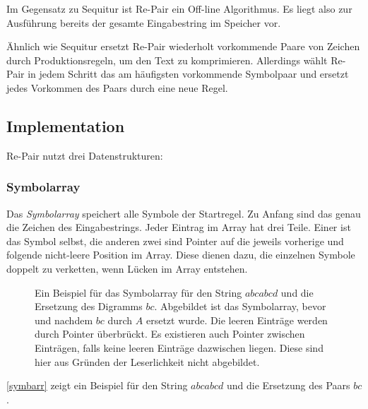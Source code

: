 Im Gegensatz zu Sequitur ist Re-Pair \cite{larsson_off-line_2000} ein Off-line Algorithmus. Es liegt also zur Ausführung bereits der gesamte Eingabestring im Speicher vor.

Ähnlich wie Sequitur ersetzt Re-Pair wiederholt vorkommende Paare von Zeichen durch Produktionsregeln, um den Text zu komprimieren. Allerdings wählt Re-Pair in jedem Schritt das am häufigsten vorkommende Symbolpaar und ersetzt jedes Vorkommen des Paars durch eine neue Regel.

\subsection{Implementation}

Re-Pair nutzt drei Datenstrukturen:

\subsubsection{Symbolarray}

Das \emph{Symbolarray} speichert alle Symbole der Startregel. Zu Anfang sind das genau die Zeichen des Eingabestrings. Jeder Eintrag im Array hat drei Teile. Einer ist das Symbol selbst, die anderen zwei sind Pointer auf die jeweils vorherige und folgende nicht-leere Position im Array. Diese dienen dazu, die einzelnen Symbole doppelt zu verketten, wenn Lücken im Array entstehen.
\begin{figure}
	\centering
	\caption{Ein Beispiel für das Symbolarray für den String $abcabcd$ und die Ersetzung des Digramms $bc$. Abgebildet ist das Symbolarray, bevor und nachdem $bc$ durch $A$ ersetzt wurde. Die leeren Einträge werden durch Pointer überbrückt. Es existieren auch Pointer zwischen Einträgen, falls keine leeren Einträge dazwischen liegen. Diese sind hier aus Gründen der Leserlichkeit nicht abgebildet.}
    \label{symbarr}
\end{figure}
\autoref{symbarr} zeigt ein Beispiel für den String $abcabcd$ und die Ersetzung des Paars $bc$.

